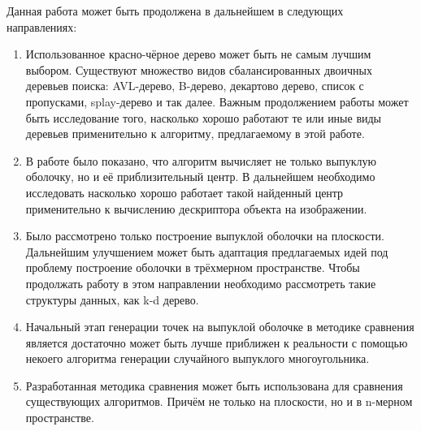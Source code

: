 Данная работа может быть продолжена в дальнейшем в следующих направлениях:
\begin{enumerate}
	\item Использованное красно-чёрное дерево может быть не самым лучшим выбором. Существуют множество видов сбалансированных двоичных деревьев поиска: AVL-дерево, B-дерево, декартово дерево, список с пропусками, splay-дерево и так далее\cite{neerc2010algorithms}. Важным продолжением работы может быть исследование того, насколько хорошо работают те или иные виды деревьев применительно к алгоритму, предлагаемому в этой работе.
	\item В работе было показано, что алгоритм вычисляет не только выпуклую оболочку, но и её приблизительный центр. В дальнейшем необходимо исследовать насколько хорошо работает такой найденный центр применительно к вычислению дескриптора объекта на изображении.
	\item Было рассмотрено только построение выпуклой оболочки на плоскости. Дальнейшим улучшением может быть адаптация предлагаемых идей под проблему построение оболочки в трёхмерном пространстве. Чтобы продолжать работу в этом направлении необходимо рассмотреть такие структуры данных, как k-d дерево\cite{bentley1975multidimensional}.
	\item Начальный этап генерации точек на выпуклой оболочке в методике сравнения является достаточно может быть лучше приближен к реальности с помощью некоего алгоритма генерации случайного выпуклого многоугольника.
	\item Разработанная методика сравнения может быть использована для сравнения существующих алгоритмов. Причём не только на плоскости, но и в n-мерном пространстве.
\end{enumerate}
